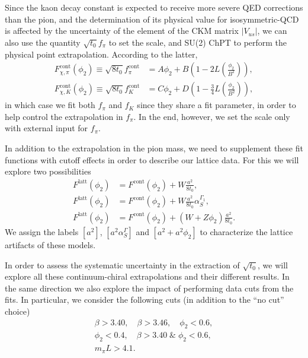 Since the kaon decay constant is expected to receive more severe QED corrections than the pion, and the determination of its physical value for isosymmetric-QCD is affected by the uncertainty of the element of the CKM matrix $|V_{us}|$, we can also use the quantity $\sqrt{t_0}f_{\pi}$ to set the scale, and SU(2) ChPT to perform the physical point extrapolation. According to the latter,
\begin{align}
F_{\chi,\pi}^{\textrm{cont}}(\phi_2)\equiv\sqrt{8t_0}f_{\pi}^{\textrm{cont}}&=A\phi_2+B\left(1-2L\left(\frac{\phi_2}{B^2}\right)\right),\\
F_{\chi,K}^{\textrm{cont}}(\phi_2)\equiv\sqrt{8t_0}f_K^{\textrm{cont}}&=C\phi_2+D\left(1-\frac{3}{4}L\left(\frac{\phi_2}{B^2}\right)\right),
\end{align}
in which case we fit both $f_{\pi}$ and $f_K$ since they share a fit parameter, in order to help control the extrapolation in $f_{\pi}$. In the end, however, we set the scale only with external input for $f_{\pi}$.

In addition to the extrapolation in the pion mass, we need to supplement these fit functions with cutoff effects in order to describe our lattice data. For this we will explore two possibilities
\begin{align}
\label{ch_ss:eq:a2}
F^{\textrm{latt}}(\phi_2)&=F^{\textrm{cont}}(\phi_2)+W\frac{a^2}{8t_0},\\
F^{\textrm{latt}}(\phi_2)&=F^{\textrm{cont}}(\phi_2)+W\frac{a^2}{8t_0}\alpha_S^{\Gamma_1},\\
F^{\textrm{latt}}(\phi_2)&=F^{\textrm{cont}}(\phi_2)+\left(W+Z\phi_2\right)\frac{a^2}{8t_0}.
\end{align}
We assign the labels $[a^2]$, $[a^2\alpha_S^{\Gamma}]$ and $[a^2+a^2\phi_2]$ to characterize the lattice artifacts of these models.

In order to assess the systematic uncertainty in the extraction of $\sqrt{t_0}$, we will explore all these continuum-chiral extrapolations and their different results. In the same direction we also explore the impact of performing data cuts from the fits. In particular, we consider the following cuts (in addition to the ``no cut'' choice)
\begin{gather}
\beta>3.40, \quad
\beta>3.46, \quad
\phi_2<0.6, \\
\phi_2<0.4, \quad
\beta>3.40\;\&\;\phi_2<0.6, \\
m_{\pi}L>4.1.
\end{gather}

